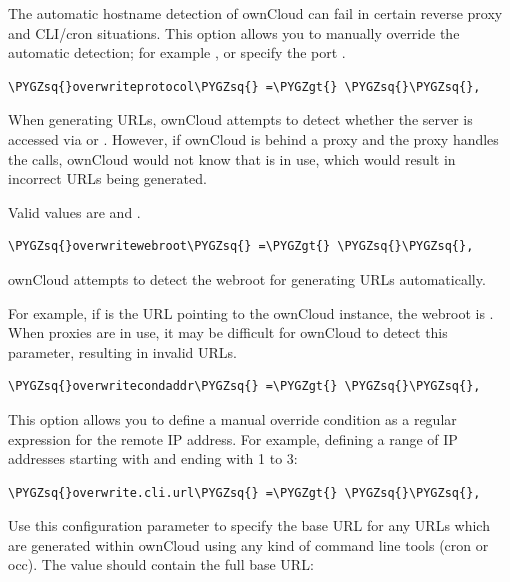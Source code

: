 \documentclass[letterpaper,10pt,english]{sphinxmanual}
\def\PYGZgt{\char`\>}
\def\PYGZsq{\char`\'}
\begin{document}
The automatic hostname detection of ownCloud can fail in certain reverse
proxy and CLI/cron situations. This option allows you to manually override
the automatic detection; for example , or specify the port
.

\begin{Verbatim}[commandchars=\\\{\}]
\PYGZsq{}overwriteprotocol\PYGZsq{} =\PYGZgt{} \PYGZsq{}\PYGZsq{},
\end{Verbatim}

When generating URLs, ownCloud attempts to detect whether the server is
accessed via  or . However, if ownCloud is behind a proxy
and the proxy handles the  calls, ownCloud would not know that
 is in use, which would result in incorrect URLs being generated.

Valid values are  and .

\begin{Verbatim}[commandchars=\\\{\}]
\PYGZsq{}overwritewebroot\PYGZsq{} =\PYGZgt{} \PYGZsq{}\PYGZsq{},
\end{Verbatim}

ownCloud attempts to detect the webroot for generating URLs automatically.

For example, if  is the URL pointing to the
ownCloud instance, the webroot is . When proxies are in use, it
may be difficult for ownCloud to detect this parameter, resulting in invalid
URLs.

\begin{Verbatim}[commandchars=\\\{\}]
\PYGZsq{}overwritecondaddr\PYGZsq{} =\PYGZgt{} \PYGZsq{}\PYGZsq{},
\end{Verbatim}

This option allows you to define a manual override condition as a regular
expression for the remote IP address. For example, defining a range of IP
addresses starting with  and ending with 1 to 3:

\begin{Verbatim}[commandchars=\\\{\}]
\PYGZsq{}overwrite.cli.url\PYGZsq{} =\PYGZgt{} \PYGZsq{}\PYGZsq{},
\end{Verbatim}

Use this configuration parameter to specify the base URL for any URLs which
are generated within ownCloud using any kind of command line tools (cron or
occ). The value should contain the full base URL:
\end{document}
